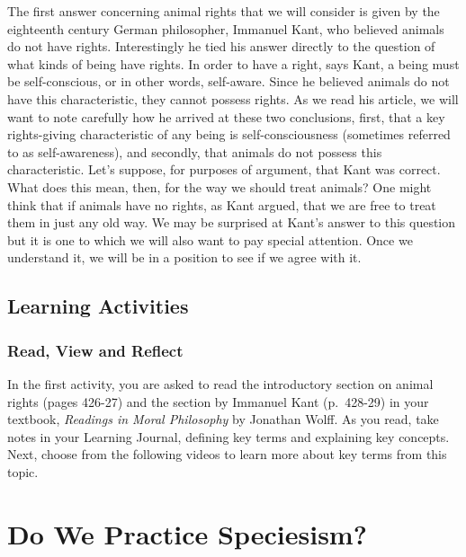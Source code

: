 \documentclass[
]{book}
\begin{document}
The first answer concerning animal rights that we will consider is given by the eighteenth century German philosopher, Immanuel Kant, who believed animals do not have rights. Interestingly he tied his answer directly to the question of what kinds of being have rights. In order to have a right, says Kant, a being must be self-conscious, or in other words, self-aware. Since he believed animals do not have this characteristic, they cannot possess rights.
As we read his article, we will want to note carefully how he arrived at these two conclusions, first, that a key rights-giving characteristic of any being is self-consciousness (sometimes referred to as self-awareness), and secondly, that animals do not possess this characteristic.
Let's suppose, for purposes of argument, that Kant was correct. What does this mean, then, for the way we should treat animals? One might think that if animals have no rights, as Kant argued, that we are free to treat them in just any old way. We may be surprised at Kant's answer to this question but it is one to which we will also want to pay special attention. Once we understand it, we will be in a position to see if we agree with it.

\hypertarget{learning-activities-16}{%
\subsection*{Learning Activities}\label{learning-activities-16}}

\begin{reflect}
\hypertarget{read-view-and-reflect-21}{%
\subsubsection*{Read, View and Reflect}\label{read-view-and-reflect-21}}

In the first activity, you are asked to read the introductory section on animal
rights (pages 426-27) and the section by Immanuel Kant (p.~428-29) in your
textbook, \emph{Readings in Moral Philosophy} by Jonathan Wolff. As you read, take
notes in your Learning Journal, defining key terms and explaining key concepts.
Next, choose from the following videos to learn more about key terms from this
topic.
\end{reflect}

\hypertarget{do-we-practice-speciesism}{%
\section*{Do We Practice Speciesism?}\label{do-we-practice-speciesism}}
\end{document}
